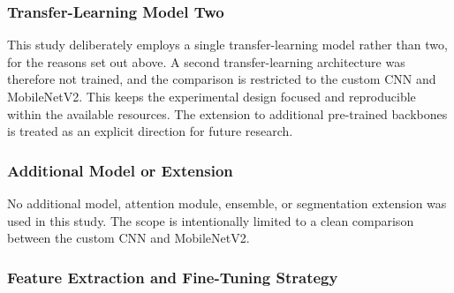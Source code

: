 \documentclass[preprint,12pt]{elsarticle}
\begin{document}
\subsubsection{Transfer-Learning Model Two}

This study deliberately employs a single transfer-learning model rather than two, for the reasons set out above.
A second transfer-learning architecture was therefore not trained, and the comparison is restricted to the custom CNN and MobileNetV2.
This keeps the experimental design focused and reproducible within the available resources.
The extension to additional pre-trained backbones is treated as an explicit direction for future research.

\subsubsection{Additional Model or Extension}

No additional model, attention module, ensemble, or segmentation extension was used in this study.
The scope is intentionally limited to a clean comparison between the custom CNN and MobileNetV2.

\subsubsection{Feature Extraction and Fine-Tuning Strategy}
\end{document}
